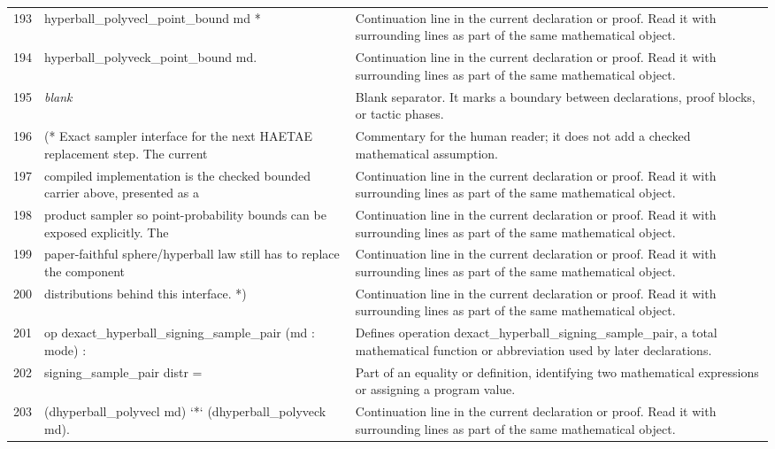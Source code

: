 \documentclass[10pt]{article}
\begin{document}
\begin{longtable}{r L{0.53\textwidth} L{0.37\textwidth}}
193 & {\ttfamily\scriptsize   hyperball\_polyvecl\_point\_bound md *} & Continuation line in the current declaration or proof.  Read it with surrounding lines as part of the same mathematical object. \\
194 & {\ttfamily\scriptsize   hyperball\_polyveck\_point\_bound md.} & Continuation line in the current declaration or proof.  Read it with surrounding lines as part of the same mathematical object. \\
195 & {\ttfamily\scriptsize \emph{blank}} & Blank separator.  It marks a boundary between declarations, proof blocks, or tactic phases. \\
196 & {\ttfamily\scriptsize (* Exact sampler interface for the next HAETAE replacement step. The current} & Commentary for the human reader; it does not add a checked mathematical assumption. \\
197 & {\ttfamily\scriptsize    compiled implementation is the checked bounded carrier above, presented as a} & Continuation line in the current declaration or proof.  Read it with surrounding lines as part of the same mathematical object. \\
198 & {\ttfamily\scriptsize    product sampler so point-probability bounds can be exposed explicitly. The} & Continuation line in the current declaration or proof.  Read it with surrounding lines as part of the same mathematical object. \\
199 & {\ttfamily\scriptsize    paper-faithful sphere/hyperball law still has to replace the component} & Continuation line in the current declaration or proof.  Read it with surrounding lines as part of the same mathematical object. \\
200 & {\ttfamily\scriptsize    distributions behind this interface. *)} & Continuation line in the current declaration or proof.  Read it with surrounding lines as part of the same mathematical object. \\
201 & {\ttfamily\scriptsize op dexact\_hyperball\_signing\_sample\_pair (md : mode) :} & Defines operation dexact\_hyperball\_signing\_sample\_pair, a total mathematical function or abbreviation used by later declarations. \\
202 & {\ttfamily\scriptsize    signing\_sample\_pair distr =} & Part of an equality or definition, identifying two mathematical expressions or assigning a program value. \\
203 & {\ttfamily\scriptsize   (dhyperball\_polyvecl md) `*` (dhyperball\_polyveck md).} & Continuation line in the current declaration or proof.  Read it with surrounding lines as part of the same mathematical object. \\

\end{longtable}
\end{document}
